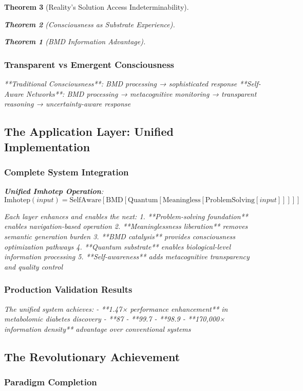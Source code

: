 \documentclass[12pt,a4paper]{article}
\newtheorem{theorem}{Theorem}[section]
\theoremstyle{remark}
\begin{document}
\begin{theorem}[Reality's Solution Access Indeterminability]
\begin{theorem}[Consciousness as Substrate Experience]
\begin{theorem}[BMD Information Advantage]
{{{\subsubsection{Transparent vs Emergent Consciousness}

**Traditional Consciousness**: BMD processing → sophisticated response
**Self-Aware Networks**: BMD processing → metacognitive monitoring → transparent reasoning → uncertainty-aware response

\subsection{The Application Layer: Unified Implementation}

\subsubsection{Complete System Integration}

\textbf{Unified Imhotep Operation}:
$$\text{Imhotep}(input) = \text{SelfAware}[\text{BMD}[\text{Quantum}[\text{Meaningless}[\text{ProblemSolving}[input]]]]]$$

Each layer enhances and enables the next:
1. **Problem-solving foundation** enables navigation-based operation
2. **Meaninglessness liberation** removes semantic generation burden  
3. **BMD catalysis** provides consciousness optimization pathways
4. **Quantum substrate** enables biological-level information processing
5. **Self-awareness** adds metacognitive transparency and quality control

\subsubsection{Production Validation Results}

The unified system achieves:
- **1.47× performance enhancement** in metabolomic diabetes discovery
- **87%
- **99.7%
- **98.9%
- **170,000× information density** advantage over conventional systems

\subsection{The Revolutionary Achievement}

\subsubsection{Paradigm Completion}

}}}
\end{theorem}
\end{theorem}
\end{theorem}
\end{document}
